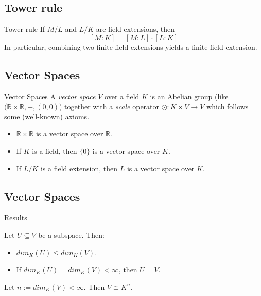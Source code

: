 \documentclass[%
	sans,
	12pt,
]{beamer}
\newcommand{\RR}{\mathbb{R}}
\begin{document}
\subsection{Tower rule}
\begin{frame}{Tower rule}
If $M/L$ and $L/K$ are field extensions, then
\[[M : K] = [M : L] \cdot [L : K]\]\pause %
In particular, combining two finite field extensions yields a finite field extension. %
\end{frame}

\subsection{Vector Spaces}
\begin{frame}{Vector Spaces}\pause
A \emph{vector space} $V$ over a field $K$ is an Abelian group (like $(\RR\times\RR,+,(0,0)$) together with a \emph{scale} operator $\odot:K\times V \to V$ which follows some (well-known) axioms.\pause
\begin{itemize}
\item $\RR \times \RR$ is a vector space over $\RR$.\pause
\item If $K$ is a field, then $\{0\}$ is a vector space over $K$.\pause
\item If $L/K$ is a field extension, then $L$ is a vector space over $K$.
\end{itemize}
\end{frame}

\subsection{Vector Spaces}
\begin{frame}{Results}\pause
\begin{theorem}
	\upshape
	Let $U \subseteq V$ be a subspace. Then:
	\begin{itemize}
		\item $dim_K(U) \le dim_K(V)$.
		\item If $dim_K(U)=dim_K(V) < \infty$, then $U = V$.
	\end{itemize} %
\end{theorem}\pause
\begin{theorem}
	\upshape
	Let $n := dim_K(V) < \infty$. Then $V \cong K^n$.
\end{theorem}
\end{frame}
\end{document}

